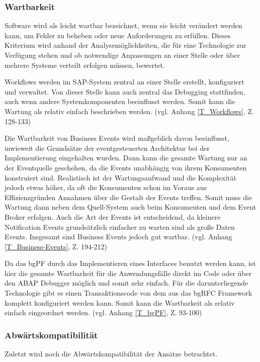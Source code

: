 \subsubsection{Wartbarkeit}

Software wird als leicht wartbar bezeichnet, wenn sie leicht verändert werden kann, um Fehler zu beheben oder neue Anforderungen zu erfüllen. Dieses Kriterium wird anhand der Analysemöglichkeiten, die für eine Technologie zur Verfügung stehen und ob notwendige Anpassungen an einer Stelle oder über mehrere Systeme verteilt erfolgen müssen, bewertet.

Workflows werden im SAP-System zentral an einer Stelle erstellt, konfiguriert und verwaltet. Von dieser Stelle kann auch zentral das Debugging stattfinden, auch wenn andere Systemkomponenten beeinflusst werden. Somit kann die Wartung als relativ einfach beschrieben werden. (vgl. Anhang \ref{T_Workflows}, Z. 128-133)

Die Wartbarkeit von Business Events wird ma{\ss}geblich davon beeinflusst, inwieweit die Grundsätze der eventgesteuerten Architektur bei der Implementierung eingehalten wurden. Dann kann die gesamte Wartung nur an der Eventquelle geschehen, da die Events unabhängig von ihrem Konsumenten konstruiert sind. Realistisch ist der Wartungsaufwand und die Komplexität jedoch etwas höher, da oft die Konsumenten schon im Voraus aus Effizienzgründen Annahmen über die Gestalt der Events treffen. Somit muss die Wartung dann neben dem Quell-System auch beim Konsumenten und dem Event Broker erfolgen. Auch die Art der Events ist entscheidend, da kleinere Notification Events grundsätzlich einfacher zu warten sind als gro{\ss}e Daten Events. Insgesamt sind Business Events jedoch gut wartbar. (vgl. Anhang \ref{T_Business-Events}, Z. 194-212)

Da das bgPF durch das Implementieren eines Interfaces benutzt werden kann, ist hier die gesamte Wartbarkeit für die Anwendungsfälle direkt im Code oder über den ABAP Debugger möglich und somit sehr einfach. Für die darunterliegende Technologie gibt es einen Transaktionscode von dem aus das bgRFC Framework komplett konfiguriert werden kann. Somit kann die Wartbarkeit als relativ einfach eingeordnet werden. (vgl. Anhang \ref{T_bgPF}, Z. 93-100)

\subsubsection{Abwärtskompatibilität}

Zuletzt wird noch die Abwärtskompatibilität der Ansätze betrachtet. 

